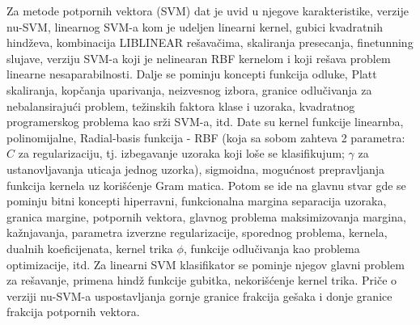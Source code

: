 \documentclass[fontsize=12bp, paper=a4]{scrarticle}
\begin{document}
\vbox{}


Za metode potpornih vektora (SVM) dat je uvid u njegove karakteristike, verzije nu-SVM, linearnog SVM-a kom je udeljen linearni kernel, gubici kvadratnih hindževa, kombinacija  LIBLINEAR rešavačima, skaliranja presecanja, finetunning slujave, verziju SVM-a koji je nelinearan RBF kernelom i koji rešava problem linearne nesaparabilnosti. Dalje se pominju  koncepti funkcija odluke, Platt skaliranja, kopčanja uparivanja, neizvesnog izbora, granice odlučivanja za nebalansirajući problem, težinskih faktora klase i uzoraka, kvadratnog programerskog problema kao srži SVM-a, itd. Date su kernel funkcije linearnba, polinomijalne, Radial-basis funkcija - RBF (koja sa sobom zahteva 2 parametra: $C$ za regularizaciju, tj. izbegavanje uzoraka koji loše se klasifikujum; $\gamma$ za ustanovljavanja uticaja jednog uzorka), sigmoidna, mogućnost prepravljanja funkcija kernela uz korišćenje Gram matica. Potom se ide na glavnu stvar gde se pominju bitni koncepti hiperravni, funkcionalna margina separacija uzoraka, granica margine, potpornih vektora, glavnog problema maksimizovanja margina, kažnjavanja, parametra izverzne regularizacije, sporednog problema, kernela, dualnih koeficijenata, kernel trika $\phi$, funkcije odlučivanja kao problema optimizacije, itd. Za linearni SVM klasifikator se pominje njegov glavni problem za rešavanje, primena hindž funkcije gubitka, nekorišćenje kernel trika. Priče o verziji nu-SVM-a uspostavljanja gornje granice frakcija gešaka i donje granice frakcija potpornih vektora.

\vbox{}
\end{document}
